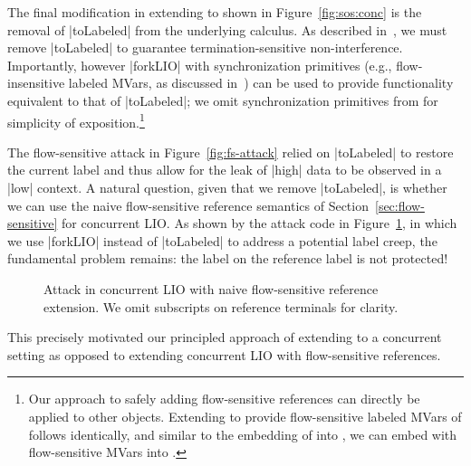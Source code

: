 The final modification in extending \lioafs{} to \lioconc{} shown in
Figure~\ref{fig:sos:conc} is the removal of |toLabeled| from the underlying
calculus.
%
As described in~\cite{stefan:addressing-covert}, we must remove |toLabeled| to
guarantee termination-sensitive non-interference.
%
Importantly, however |forkLIO| with synchronization primitives (e.g.,
flow-insensitive labeled MVars, as discussed
in~\cite{stefan:addressing-covert}) can be used to provide functionality
equivalent to that of |toLabeled|;
%
we omit synchronization primitives from \lioconc{} for simplicity of
exposition.\footnote{
Our approach to safely adding flow-sensitive references can directly
be applied to other objects.
%
Extending \lioconc{} to provide flow-sensitive labeled MVars of follows
identically, and similar to the embedding of \liofs{} into \lio{}, we can embed
\lioconc{} with flow-sensitive MVars into \lioconc.
}

The flow-sensitive attack in Figure~\ref{fig:fs-attack} relied on |toLabeled|
to restore the current label and thus allow for the leak of |high| data to be
observed in a |low| context.
%
A natural question, given that we remove |toLabeled|, is whether we can use the
naive flow-sensitive reference semantics of Section~\ref{sec:flow-sensitive}
for concurrent LIO.
%
As shown by the attack code in Figure~\ref{fig:fs-conc-attack}, in which we use
|forkLIO| instead of |toLabeled| to address a potential label creep, the
fundamental problem remains: the label on the reference label is not protected!
%
\begin{figure}
\small
{}
\cut{$}
\caption{Attack in concurrent LIO with naive flow-sensitive reference
extension. We omit subscripts on reference terminals for clarity.
\label{fig:fs-conc-attack}}
\end{figure}
%
This precisely motivated our principled approach of extending \lioafs{} to a
concurrent setting as opposed to extending concurrent LIO with flow-sensitive
references.


